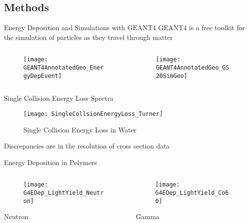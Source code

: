 \subsection{Methods}
\begin{frame}{Energy Deposition and Simulations with GEANT4}
GEANT4 is a free toolkit for the simulation of particles as they travel through matter\cite{agostinelli_geant4simulation_2003}
\label{G4Main}
  \begin{columns}[onlytextwidth]
  \begin{column}{0.49\textwidth}
    \centering
    \begin{figure}
    \texttt{[image: GEANT4AnnotatedGeo\_EnergyDepEvent]}
    \end{figure}
  \end{column}
  \begin{column}{0.49\textwidth}
    \centering
    \begin{figure}
	  \texttt{[image: GEANT4AnnotatedGeo\_GS20SimGeo]}
    \end{figure}
  \end{column}
  \end{columns}
\hyperlink{G4Intro}{}
\end{frame}
\begin{frame}{Single Collision Energy Loss Spectra}
  \begin{figure}
    \texttt{[image: SingleCollsionEnergyLoss\_Turner]}
    \caption{Single Collision Energy Loss in Water\cite{turner_comparative_1982}}
  \end{figure}
\vspace{2mm}
Discrepancies are in the resolution of cross section data
\end{frame}
\begin{frame}{Energy Deposition in Polymers}
  \begin{columns}[onlytextwidth]
  \begin{column}{0.5\textwidth}
    \centering
    \begin{figure}
    	\texttt{[image: G4EDep\_LightYield\_Neutron]}
    \end{figure}
      Neutron
  \end{column}
  \begin{column}{0.5\textwidth}
    \centering
    \begin{figure}
    	\texttt{[image: G4EDep\_LightYield\_Co60]}
    \end{figure}
       Gamma
  \end{column}
  \end{columns}
\end{frame}

